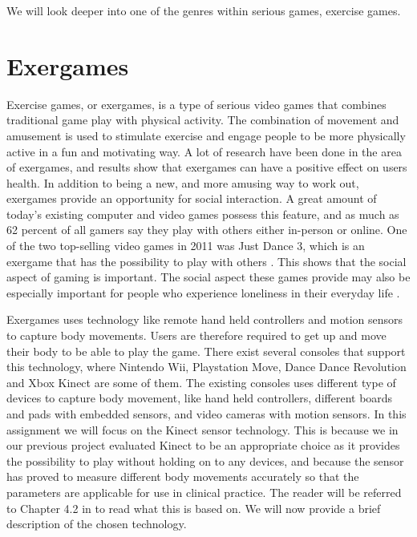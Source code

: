 We will look deeper into one of the genres within serious games, exercise games.  

\section{Exergames}
\label{sec:exergames}
Exercise games, or exergames, is a type of serious video games that combines traditional game play with physical activity. The combination of movement and amusement is used to stimulate exercise and engage people to be more physically active in a fun and motivating way. A lot of research have been done in the area of exergames, and results show that exergames can have a positive effect on users health. In addition to being a new, and more amusing way to work out, exergames provide an opportunity for social interaction. A great amount of today's existing computer and video games possess this feature, and as much as 62 percent of all gamers say they play with others either in-person or online. One of the two top-selling video games in 2011 was Just Dance 3, which is an exergame that has the possibility to play with others \cite{statistics2012}. This shows that the social aspect of gaming is important. The social aspect these games provide may also be especially important for people who experience loneliness in their everyday life \cite{exergamesforelderly}.

Exergames uses technology like remote hand held controllers and motion sensors to capture body movements. Users are therefore required to get up and move their body to be able to play the game. There exist several consoles that support this technology, where Nintendo Wii, Playstation Move, Dance Dance Revolution and Xbox Kinect are some of them. The existing consoles uses different type of devices to capture body movement, like hand held controllers, different boards and pads with embedded sensors, and video cameras with motion sensors. In this assignment we will focus on the Kinect sensor technology. This is because we in our previous project evaluated Kinect to be an appropriate choice as it provides the possibility to play without holding on to any devices, and because the sensor has proved to measure different body movements accurately so that the parameters are applicable for use in clinical practice. The reader will be referred to Chapter 4.2 in \cite{project} to read what this is based on. We will now provide a brief description of the chosen technology.


